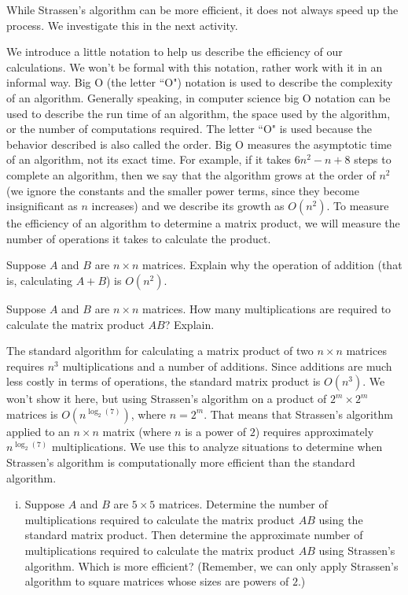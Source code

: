 While Strassen's algorithm can be more efficient, it does not always speed up the process. We investigate this in the next activity. 

\begin{pactivity} We introduce a little notation to help us describe the efficiency of our calculations. We won't be formal with this notation, rather work with it in an informal way. Big O (the letter ``O") notation is used to describe the complexity of an algorithm. Generally speaking, in computer science big O notation can be used to describe the run time of an algorithm, the space used by the algorithm, or the number of computations required. The letter ``O" is used because the behavior described is also called the order. Big O measures the asymptotic time of an algorithm, not its exact time. For example, if it takes $6n^2-n+8$ steps to complete an algorithm, then we say that the algorithm grows at the order of $n^2$ (we ignore the constants and the smaller power terms, since they become insignificant as $n$ increases) and we describe its growth as $O{\left(n^2\right)}$. To measure the efficiency of an algorithm to determine a matrix product, we will measure the number of operations it takes to calculate the product. 

\ba
\item Suppose $A$ and $B$ are $n \times n$ matrices. Explain why the operation of addition (that is, calculating $A+B$) is $O{\left(n^2\right)}$. 


\item Suppose $A$ and $B$ are $n \times n$ matrices. How many multiplications are required to calculate the matrix product $AB$? Explain. 
 
\item The standard algorithm for calculating a matrix product of two $n \times n$ matrices requires $n^3$ multiplications and a number of additions. Since additions are much less costly in terms of operations, the standard matrix product is $O{\left(n^3\right)}$. We won't show it here, but using Strassen's algorithm on a product of $2^m \times 2^m$ matrices is $O{\left(n^{\log_2(7)}\right)}$, where $n = 2^m$. That means that Strassen's algorithm applied to an $n \times n$ matrix (where $n$ is a power of $2$) requires approximately $n^{\log_2(7)}$ multiplications. We use this to analyze situations to determine when Strassen's algorithm is computationally more efficient than the standard algorithm.
	\begin{enumerate}[i.]
	\item  Suppose $A$ and $B$ are $5 \times 5$ matrices. Determine the number of multiplications required to calculate the matrix product $AB$ using the standard matrix product. Then determine the approximate number of multiplications required to calculate the matrix product $AB$ using Strassen's algorithm. Which is more efficient? (Remember, we can only apply Strassen's algorithm to square matrices whose sizes are powers of $2$.) 


\end{enumerate}
\end{pactivity}
